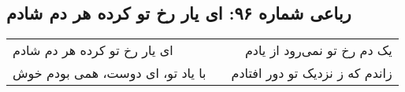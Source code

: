 \begin{center}
\section*{رباعی شماره ۹۶: ای یار رخ تو کرده هر دم شادم}
\label{sec:096}
\begin{longtable}{l p{0.5cm} r}
ای یار رخ تو کرده هر دم شادم
&&
یک دم رخ تو نمی‌رود از یادم
\\
با یاد تو، ای دوست، همی بودم خوش
&&
زاندم که ز نزدیک تو دور افتادم
\\
\end{longtable}
\end{center}
